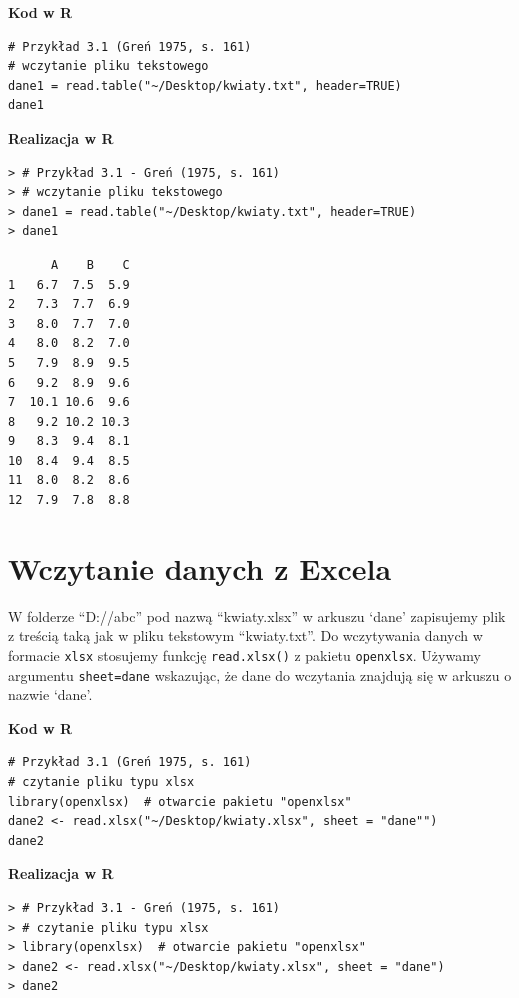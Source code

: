 \documentclass[12pt,B5paper,]{book}
\begin{document}
\vspace{0.8cm}

\textbf{Kod w R}

\begin{verbatim}
# Przykład 3.1 (Greń 1975, s. 161)
# wczytanie pliku tekstowego
dane1 = read.table("~/Desktop/kwiaty.txt", header=TRUE)
dane1
\end{verbatim}

\vspace{0.8cm} \textbf{Realizacja w R}

\begin{verbatim}
> # Przykład 3.1 - Greń (1975, s. 161)
> # wczytanie pliku tekstowego
> dane1 = read.table("~/Desktop/kwiaty.txt", header=TRUE)
> dane1
\end{verbatim}

\begin{verbatim}
      A    B    C
1   6.7  7.5  5.9
2   7.3  7.7  6.9
3   8.0  7.7  7.0
4   8.0  8.2  7.0
5   7.9  8.9  9.5
6   9.2  8.9  9.6
7  10.1 10.6  9.6
8   9.2 10.2 10.3
9   8.3  9.4  8.1
10  8.4  9.4  8.5
11  8.0  8.2  8.6
12  7.9  7.8  8.8
\end{verbatim}

\section{Wczytanie danych z Excela}\label{wczytanie-danych-z-excela}

W folderze ``D://abc'' pod nazwą ``kwiaty.xlsx'' w arkuszu `dane'
zapisujemy plik z treścią taką jak w pliku tekstowym ``kwiaty.txt''. Do
wczytywania danych w formacie \texttt{xlsx} stosujemy funkcję
\texttt{read.xlsx()} z pakietu \texttt{openxlsx}. Używamy argumentu
\texttt{sheet=dane} wskazując, że dane do wczytania znajdują się w
arkuszu o nazwie `dane'. \vspace{0.8cm}

\textbf{Kod w R}

\begin{verbatim}
# Przykład 3.1 (Greń 1975, s. 161)
# czytanie pliku typu xlsx 
library(openxlsx)  # otwarcie pakietu "openxlsx"
dane2 <- read.xlsx("~/Desktop/kwiaty.xlsx", sheet = "dane"")
dane2
\end{verbatim}

\vspace{0.8cm} \textbf{Realizacja w R}

\begin{verbatim}
> # Przykład 3.1 - Greń (1975, s. 161)
> # czytanie pliku typu xlsx 
> library(openxlsx)  # otwarcie pakietu "openxlsx"
> dane2 <- read.xlsx("~/Desktop/kwiaty.xlsx", sheet = "dane")
> dane2
\end{verbatim}
\end{document}
